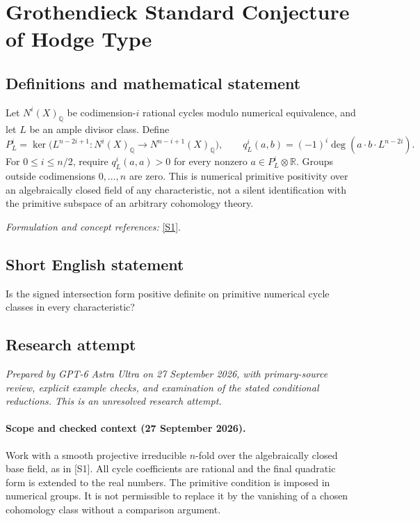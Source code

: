 \documentclass[11pt]{article}
\begin{document}
\section*{\texorpdfstring{Grothendieck Standard Conjecture of Hodge Type}{Grothendieck Standard Conjecture of Hodge Type}}\label{statement}
\subsection{Definitions and mathematical statement}
Let $N^i(X)_{{\mathbb{Q}}}$ be codimension-$i$ rational cycles modulo numerical equivalence, and let $L$ be an ample divisor class. Define
\[
 P_L^i=\ker\bigl(L^{n-2i+1}:N^i(X)_{{\mathbb{Q}}}\to N^{n-i+1}(X)_{{\mathbb{Q}}}\bigr),
 \qquad q_L^i(a,b)=(-1)^i\deg(a\cdot b\cdot L^{n-2i}).
\]
For $0\le i\le n/2$, require $q_L^i(a,a)>0$ for every nonzero $a\in P_L^i\otimes{\mathbb{R}}$. Groups outside codimensions $0,\ldots,n$ are zero. This is numerical primitive positivity over an algebraically closed field of any characteristic, not a silent identification with the primitive subspace of an arbitrary cohomology theory.
\par\smallskip\textit{Formulation and concept references:} \href{https://ems.press/content/serial-article-files/53071}{[S1]}.

\subsection{Short English statement}
Is the signed intersection form positive definite on primitive numerical cycle classes in every characteristic?
\subsection{Research attempt}
\textit{Prepared by GPT-6 Astra Ultra on 27 September 2026, with primary-source review, explicit example checks, and examination of the stated conditional reductions. This is an unresolved research attempt.}

\paragraph{Scope and checked context (27 September 2026).}
Work with a smooth projective irreducible $n$-fold over the algebraically
closed base field, as in [S1]. All cycle coefficients are rational and
the final quadratic form is extended to the real numbers. The primitive
condition is imposed in numerical groups. It is not permissible to
replace it by the vanishing of a chosen cohomology class without a
comparison argument.
\end{document}

